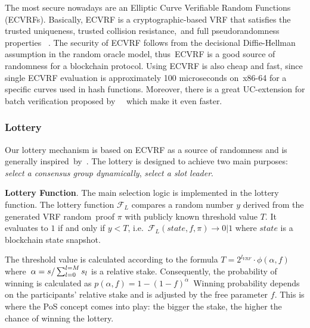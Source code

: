 The most secure nowadays are an Elliptic Curve Verifiable Random Functions (ECVRFs).
Basically, ECVRF is a cryptographic-based VRF that satisfies the trusted uniqueness, trusted collision resistance,\
and full pseudorandomness properties ~\cite{cryptoeprint:2014/905}.
The security of ECVRF follows from the decisional Diffie-Hellman assumption in the random oracle model, thus\
ECVRF is a good source of randomness for a blockchain protocol.
Using ECVRF is also cheap and fast, since single ECVRF evaluation is approximately 100 microseconds on\
x86-64 for a specific curves used in hash functions.
Moreover, there is a great UC-extension for batch verification proposed by ~\cite{cryptoeprint:2022/1045}\
which make it even faster.

\subsubsection{Lottery}
Our lottery mechanism is based on ECVRF as a source of randomness and is generally inspired\
by~\cite{cryptoeprint:2017/573}.
The lottery is designed to achieve two main purposes: \emph{select a consensus group dynamically},
\emph{select a slot leader}.

\textbf{Lottery Function}.
The main selection logic is implemented in the lottery function.
The lottery function ${\mathcal{F}}_{L}$ compares a random number $y$ derived from the generated VRF random\
proof $\pi$ with publicly known threshold value $T$.
It evaluates to $1$ if and only if ${y < T}$, i.e.\
${\mathcal{F}}_{L}(state, f, \pi) \rightarrow 0|1$ where $state$ is a blockchain state snapshot.

The threshold value is calculated according to the formula ${T = 2^{l_{VRF}}\cdot \phi(\alpha, f)}$ where\
${\alpha=s/\\\sum_{l=0}^{l=M} s_l}$ is a relative stake.
Consequently, the probability of winning is calculated as ${p(\alpha, f) = 1-(1-f)^{\alpha}}$\
Winning probability depends on the participants' relative stake and is adjusted by the free parameter $f$.
This is where the PoS concept comes into play: the bigger the stake, the higher the chance of winning the lottery.

